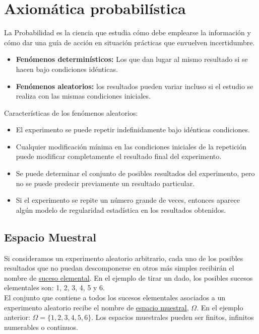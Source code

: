\chapter{Axiomática probabilística}

La Probabilidad es la ciencia que estudia cómo debe emplearse la información y cómo dar una
guía de acción en situación prácticas que envuelven incertidumbre.

\begin{itemize}
  \item \textbf{Fenómenos determinísticos:} Los que dan lugar al mismo resultado si se
        hacen bajo condiciones idénticas.
  \item \textbf{Fenómenos aleatorios:} los resultados pueden variar incluso si el estudio
        se realiza con las mismas condiciones iniciales.
\end{itemize}

Características de los fenómenos aleatorios:
\begin{itemize}
  \item El experimento se puede repetir indefinidamente bajo idénticas condiciones.
  \item Cualquier modificación mínima en las condiciones iniciales de la repetición
        puede modificar completamente el resultado final del experimento.
  \item Se puede determinar el conjunto de posibles resultados del experimento, pero
        no se puede predecir previamente un resultado particular.
  \item Si el experimento se repite un número grande de veces, entonces aparece algún
        modelo de regularidad estadística en los resultados obtenidos.
\end{itemize}

\section{Espacio Muestral}

Si consideramos un experimento aleatorio arbitrario, cada uno de los posibles resultados
que no puedan descomponerse en otros más simples recibirán el nombre de
\underline{suceso elemental}. En el ejemplo de tirar un dado, los posibles sucesos
elementales son: 1, 2, 3, 4, 5 y 6.\\


El conjunto que contiene a todos los sucesos elementales asociados a un experimento
aleatorio recibe el nombre de \underline{espacio muestral}, $\Omega$. En el ejemplo anterior:
$\Omega = \{1, 2, 3, 4, 5, 6\}$. Los espacios muestrales pueden ser finitos, infinitos numerables
o continuos.\\


